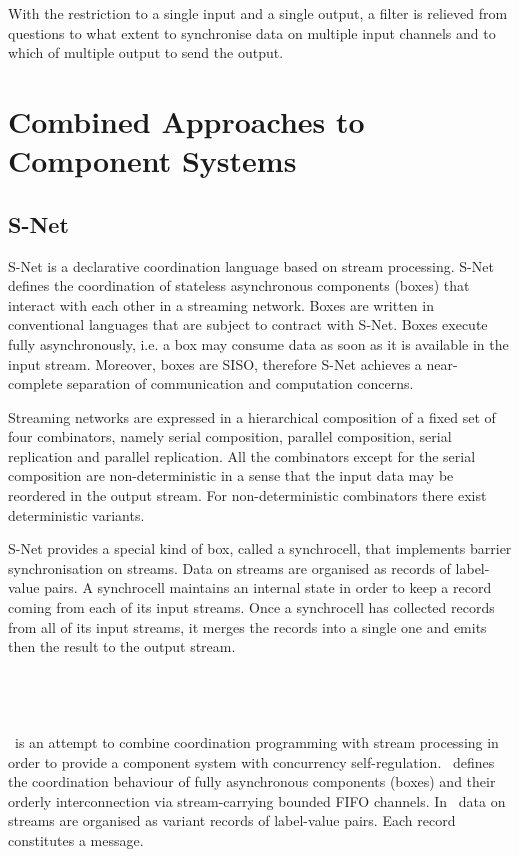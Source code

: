 With the restriction to a single input and a single output, a filter is relieved from questions to what extent to synchronise data on multiple input channels and to which of multiple output to send the output.


\section{Combined Approaches to Component Systems}

    \subsection{S-Net}
S-Net \cite{snet_intro} is a declarative coordination language based on stream processing. S-Net defines the coordination of stateless asynchronous components (boxes) that interact with each other in a streaming network. Boxes are written in conventional languages that are subject to contract with S-Net. Boxes execute fully asynchronously, i.e. a box may consume data as soon as it is available in the input stream. Moreover, boxes are SISO, therefore S-Net achieves a near-complete separation of communication and computation concerns.

Streaming networks are expressed in a hierarchical composition of a fixed set of four combinators, namely serial composition, parallel composition, serial replication and parallel replication. All the combinators except for the serial composition are non-deterministic in a sense that the input data may be reordered in the output stream. For non-deterministic combinators there exist deterministic variants.

S-Net provides a special kind of box, called a synchrocell, that implements barrier synchronisation on streams. Data on streams are organised as records of label-value pairs. A synchrocell maintains an internal state in order to keep a record coming from each of its input streams. Once a synchrocell has collected records from all of its input streams, it merges the records into a single one and emits then the result to the output stream.


    \subsection{\ak\ }
\ak\ is an attempt to combine coordination programming with stream processing in order to provide a component system with concurrency self-regulation. \ak\ defines the coordination behaviour of fully asynchronous components (boxes) and their orderly interconnection via stream-carrying bounded FIFO channels. In \ak\, data on streams are organised as variant records of label-value pairs. Each record constitutes a message.

